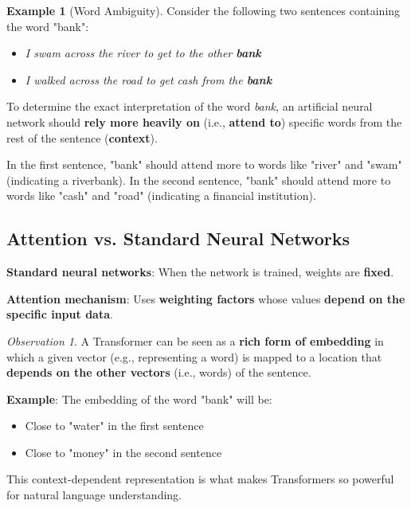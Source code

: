 \documentclass[11pt,a4paper]{article}
\theoremstyle{definition}
\newtheorem{example}{Example}[section]
\theoremstyle{plain}
\theoremstyle{remark}
\newtheorem*{observation}{Observation}
\begin{document}
\begin{example}[Word Ambiguity]
Consider the following two sentences containing the word "bank":
\begin{itemize}
    \item \textit{I swam across the river to get to the other \textbf{bank}}
    \item \textit{I walked across the road to get cash from the \textbf{bank}}
\end{itemize}

To determine the exact interpretation of the word \textit{bank}, an artificial neural network should \textbf{rely more heavily on} (i.e., \textbf{attend to}) specific words from the rest of the sentence (\textbf{context}).

In the first sentence, "bank" should attend more to words like "river" and "swam" (indicating a riverbank). In the second sentence, "bank" should attend more to words like "cash" and "road" (indicating a financial institution).
\end{example}

\subsection{Attention vs. Standard Neural Networks}

\begin{tcolorbox}[colback=orange!10!white,colframe=orange!75!black,title=\textbf{Key Difference}]
\textbf{Standard neural networks}: When the network is trained, weights are \textbf{fixed}.

\textbf{Attention mechanism}: Uses \textbf{weighting factors} whose values \textbf{depend on the specific input data}.
\end{tcolorbox}

\begin{observation}
A Transformer can be seen as a \textbf{rich form of embedding} in which a given vector (e.g., representing a word) is mapped to a location that \textbf{depends on the other vectors} (i.e., words) of the sentence.

\textbf{Example}: The embedding of the word "bank" will be:
\begin{itemize}
    \item Close to "water" in the first sentence
    \item Close to "money" in the second sentence
\end{itemize}

This context-dependent representation is what makes Transformers so powerful for natural language understanding.
\end{observation}
\end{document}
